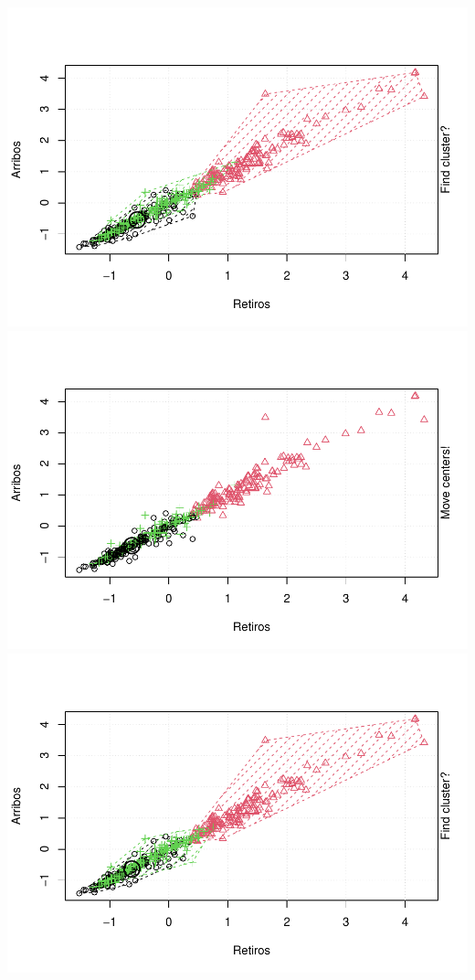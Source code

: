 \documentclass[
]{article}
\begin{document}
\includegraphics{Ecobici_files/figure-latex/unnamed-chunk-12-4.pdf}
\includegraphics{Ecobici_files/figure-latex/unnamed-chunk-12-5.pdf}
\includegraphics{Ecobici_files/figure-latex/unnamed-chunk-12-6.pdf}
\end{document}
